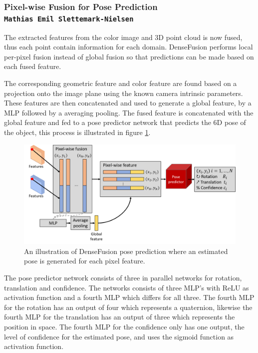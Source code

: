 \documentclass[../main.tex]{subfiles}
\begin{document}
\subsubsection{Pixel-wise Fusion for Pose Prediction\\ \normalfont\normalsize\texttt{Mathias Emil Slettemark-Nielsen}} \label{subsubsec:fusion}
The extracted features from the color image and 3D point cloud is now fused, thus each point contain information for each domain. DenseFusion performs local per-pixel fusion instead of global fusion so that predictions can be made based on each fused feature. 

The corresponding geometric feature and color feature are found based on a projection onto the image plane using the known camera intrinsic parameters. These features are then concatenated and used to generate a global feature, by a MLP followed by a averaging pooling. The fused feature is concatenated with the global feature and fed to a pose predictor network that predicts the 6D pose of the object, this process is illustrated in figure \ref{fig:pixel_wise_fusion}.

\begin{figure}[H]
    \centering
    \includegraphics[width=\textwidth]{figures/dense_fusion/pixel_wise_fusion.png}
    \caption{An illustration of DenseFusion pose prediction where an estimated pose is generated for each pixel feature.}
    \label{fig:pixel_wise_fusion}
\end{figure}

The pose predictor network consists of three in parallel networks for rotation, translation and confidence. The networks consists of three MLP's with ReLU as activation function and a fourth MLP which differs for all three. The fourth MLP for the rotation has an output of four which represents a quaternion, likewise the fourth MLP for the translation has an output of three which represents the position in space. The fourth MLP for the confidence only has one output, the level of confidence for the estimated pose, and uses the sigmoid function as activation function.
\end{document}
